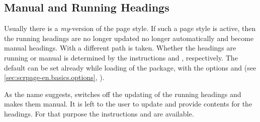 \subsection{Manual and Running Headings}
\label{sec:scrpage-en.basics.mark}
\BeginIndexGroup
{}%
%
%
Usually there is a \emph{my}-version of the 
page style.  If such a page style is active, then the running headings
are no longer updated no longer automatically and become manual
headings.  With  a different path is taken. Whether
the headings are running or manual is determined by the instructions
 and , respectively.  The default
can be set already while loading of the package, with the options
 and  (see
\autoref{sec:scrpage-en.basics.options},
).


\begin{Declaration}
\end{Declaration}%
As the name suggests,  switches off the updating of
the running headings and makes them manual. It is left to the user to
update and provide contents for the headings.  For that purpose the
instructions  and
 are available.%
%
\EndIndexGroup



